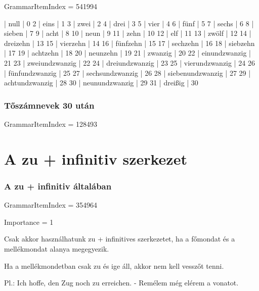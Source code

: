 \documentclass{article}
\newenvironment{desc}{\verbatim}{\endverbatim}
\newenvironment{exmp}{\verbatim}{\endverbatim}
\begin{document}
GrammarItemIndex = 541994

\begin{exmp}
1 | null | 0
2 | eins | 1
3 | zwei | 2
4 | drei | 3
5 | vier | 4
6 | fünf | 5
7 | sechs | 6
8 | sieben | 7
9 | acht | 8
10 | neun | 9
11 | zehn | 10
12 | elf | 11
13 | zwölf | 12
14 | dreizehn | 13
15 | vierzehn | 14
16 | fünfzehn | 15
17 | sechzehn | 16
18 | siebzehn | 17
19 | achtzehn | 18
20 | neunzehn | 19
21 | zwanzig | 20
22 | einundzwanzig | 21
23 | zweiundzwanzig | 22
24 | dreiundzwanzig | 23
25 | vierundzwanzig | 24
26 | fünfundzwanzig | 25
27 | sechsundzwanzig | 26
28 | siebenundzwanzig | 27
29 | achtundzwanzig | 28
30 | neunundzwanzig | 29
31 | dreißig | 30
\end{exmp}

\subsubsection{Tőszámnevek 30 után}

GrammarItemIndex = 128493

\section{A zu + infinitiv szerkezet}

\subsubsection{A zu + infinitiv általában}

GrammarItemIndex = 354964

Importance = 1

\begin{desc}
Csak akkor használhatunk zu + infinitives szerkezetet, ha a főmondat és a mellékmondat alanya megegyezik.

Ha a mellékmondetban csak zu és ige áll, akkor nem kell vesszőt tenni.

Pl.: Ich hoffe, den Zug noch zu erreichen. - Remélem még elérem a vonatot.
\end{desc}
\end{document}
